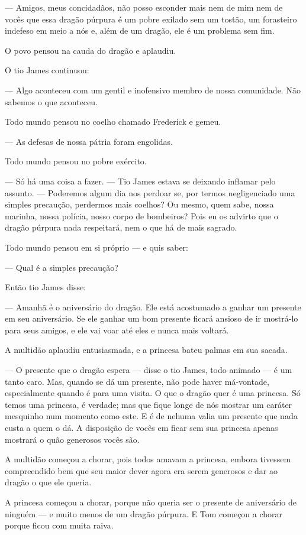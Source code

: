 — Amigos, meus concidadãos, não posso esconder mais nem de mim nem de
vocês que essa dragão púrpura é um pobre exilado sem um tostão, um
forasteiro indefeso em meio a nós e, além de um dragão, ele é um
problema sem fim.

O povo pensou na cauda do dragão e aplaudiu.

O tio James continuou:

— Algo aconteceu com um gentil e inofensivo membro de nossa
comunidade. Não sabemos o que aconteceu. 

Todo mundo pensou no coelho chamado Frederick e gemeu. 

— As defesas de nossa pátria foram engolidas.

Todo mundo pensou no pobre exército.

— Só há uma coisa a fazer. — Tio James estava se deixando inflamar
pelo assunto. — Poderemos algum dia nos perdoar se, por termos
negligenciado uma simples precaução, perdermos mais coelhos? Ou
mesmo, quem sabe, nossa marinha, nossa polícia, nosso corpo de
bombeiros? Pois eu os advirto que o dragão púrpura nada respeitará,
nem o que há de mais sagrado.

Todo mundo pensou em si próprio — e quis saber:

— Qual é a simples precaução?

Então tio James disse:

— Amanhã é o aniversário do dragão. Ele está acostumado a ganhar um
presente em seu aniversário. Se ele ganhar um bom presente ficará
ansioso de ir mostrá-lo para seus amigos, e ele vai voar até eles e
nunca mais voltará. 

A multidão aplaudiu entusiasmada, e a princesa bateu palmas em sua
sacada.

— O presente que o dragão espera — disse o tio James, todo animado — é
um tanto caro. Mas, quando se dá um presente, não pode haver
má-vontade, especialmente quando é para uma visita. O que o dragão
quer é uma princesa. Só temos uma princesa, é verdade; mas que fique
longe de nós mostrar um caráter mesquinho num momento como este. E é
de nehuma valia um presente que nada custa a quem o dá. A disposição
de vocês em ficar sem sua princesa apenas mostrará o quão generosos
vocês são.

A multidão começou a chorar, pois todos amavam a princesa, embora
tivessem compreendido bem que seu maior dever agora era serem
generosos e dar ao dragão o que ele queria.

A princesa começou a chorar, porque não queria ser o presente de
aniversário de ninguém — e muito menos de um dragão púrpura. E Tom
começou a chorar porque ficou com muita raiva. 

